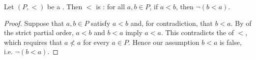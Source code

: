 \begin{lemma} \label{lemma:strict_partial_order_is_asymmetric}
    Let $(P, <)$ be a .
    Then $<$ is :
    for all $a, b \in P$, if $a < b$, then $\lnot (b < a)$.
\end{lemma}

\begin{proof}
    Suppose that $a, b \in P$ satisfy $a < b$ and, for contradiction, that $b < a$.
    By  of the strict partial order, $a < b$ and $b < a$ imply $a < a$.
    This contradicts the  of $<$, which requires that $a \not< a$ for every $a \in P$.
    Hence our assumption $b < a$ is false, i.e. $\lnot (b < a)$.
\end{proof}